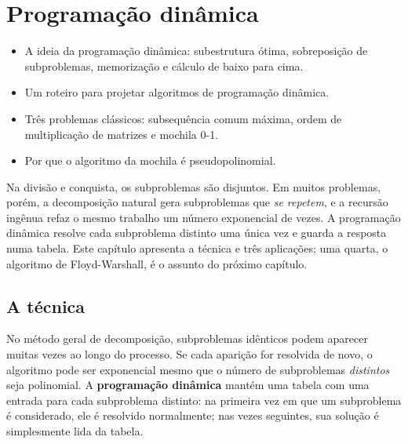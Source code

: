 \chapter{Programação dinâmica}\label{cap:pd}\label{sec:pd}
\begin{objetivos}
\begin{itemize}
  \item A ideia da programação dinâmica: subestrutura ótima, sobreposição de subproblemas, memorização e cálculo de baixo para cima.
  \item Um roteiro para projetar algoritmos de programação dinâmica.
  \item Três problemas clássicos: subsequência comum máxima, ordem de multiplicação de matrizes e mochila 0-1.
  \item Por que o algoritmo da mochila é pseudopolinomial.
\end{itemize}
\end{objetivos}

Na divisão e conquista, os subproblemas são disjuntos. Em muitos problemas, porém, a decomposição natural gera subproblemas que \emph{se repetem}, e a recursão ingênua refaz o mesmo trabalho um número exponencial de vezes. A programação dinâmica resolve cada subproblema distinto uma única vez e guarda a resposta numa tabela. Este capítulo apresenta a técnica e três aplicações; uma quarta, o algoritmo de Floyd-Warshall, é o assunto do próximo capítulo.

\section{A técnica}\label{sec:pdtecnica}
No método geral de decomposição, subproblemas idênticos podem aparecer muitas vezes ao longo do processo. Se cada aparição for resolvida de novo, o algoritmo pode ser exponencial mesmo que o número de subproblemas \emph{distintos} seja polinomial. A \textbf{programação dinâmica} mantém uma tabela com uma entrada para cada subproblema distinto: na primeira vez em que um subproblema é considerado, ele é resolvido normalmente; nas vezes seguintes, sua solução é simplesmente lida da tabela.

